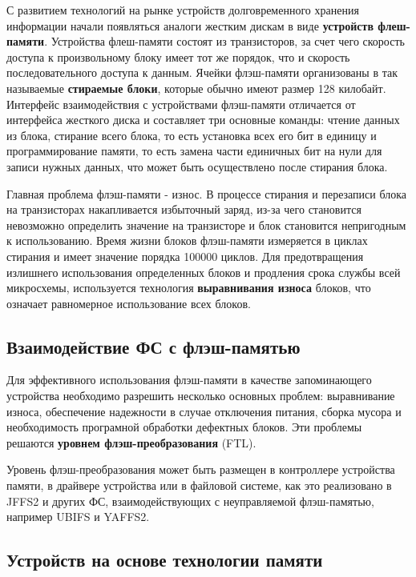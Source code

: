 С развитием технологий на рынке устройств долговременного хранения информации начали появляться аналоги жестким дискам в виде \textbf{устройств флеш-памяти}. Устройства флеш-памяти состоят из транзисторов, за счет чего скорость доступа к произвольному блоку имеет тот же порядок, что и скорость последовательного доступа к данным. Ячейки флэш-памяти организованы в так называемые \textbf{стираемые блоки}, которые обычно имеют размер 128 килобайт. Интерфейс взаимодействия с устройствами флэш-памяти отличается от интерфейса жесткого диска и составляет три основные команды: чтение данных из блока, стирание всего блока, то есть установка всех его бит в единицу и программирование памяти, то есть замена части единичных бит на нули для записи нужных данных, что может быть осуществлено после стирания блока.

Главная проблема флэш-памяти - износ. В процессе стирания и перезаписи блока на транзисторах накапливается избыточный заряд, из-за чего становится невозможно определить значение на транзисторе и блок становится непригодным к использованию. Время жизни блоков флэш-памяти измеряется в циклах стирания и имеет значение порядка 100000 циклов. Для предотвращения излишнего использования определенных блоков и продления срока службы всей микросхемы, используется технология \textbf{выравнивания износа} блоков, что означает равномерное использование всех блоков.

\subsection{Взаимодействие ФС с флэш-памятью}

Для эффективного использования флэш-памяти в качестве запоминающего устройства необходимо разрешить несколько основных проблем: выравнивание износа, обеспечение надежности в случае отключения питания, сборка мусора и необходимость програмной обработки дефектных блоков. Эти проблемы решаются \textbf{уровнем флэш-преобразования} (FTL). 

Уровень флэш-преобразования может быть размещен в контроллере устройства памяти, в драйвере устройства или в файловой системе, как это реализовано в JFFS2 и других ФС, взаимодействующих с неуправляемой флэш-памятью, например UBIFS и YAFFS2.

\subsection{Устройств на основе технологии памяти}

